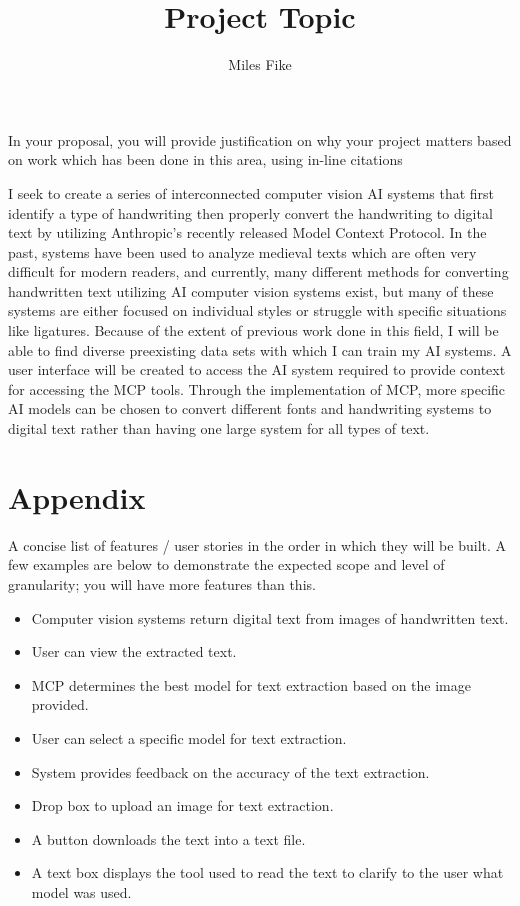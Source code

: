 \documentclass[12pt]{article}
\title{\textbf{Project Topic}}
\author{Miles Fike}
\begin{document}
\maketitle

In your proposal, you will provide justification on why your project matters based on work which has been done in this area, using in-line citations

I seek to create a series of interconnected computer vision AI systems that first identify a type of handwriting then properly convert the handwriting to digital text by utilizing Anthropic’s recently released Model Context Protocol. In the past, systems have been used to analyze medieval texts which are often very difficult for modern readers, and currently, many different methods for converting handwritten text utilizing AI computer vision systems exist, but many of these systems are either focused on individual styles or struggle with specific situations like ligatures. Because of the extent of previous work done in this field, I will be able to find diverse preexisting data sets with which I can train my AI systems. A user interface will be created to access the AI system required to provide context for accessing the MCP tools. Through the implementation of MCP, more specific AI models can be chosen to convert different fonts and handwriting systems to digital text rather than having one large system for all types of text.
\newpage
\section*{Appendix}
A concise list of features / user stories in the order in which they will be built. A few examples are below to demonstrate the expected scope and level of granularity; you will have more features than this.
\begin{itemize}
	\item Computer vision systems return digital text from images of handwritten text.
	\item User can view the extracted text.
	\item MCP determines the best model for text extraction based on the image provided.
	\item User can select a specific model for text extraction.
	\item System provides feedback on the accuracy of the text extraction.
	\item Drop box to upload an image for text extraction.
	\item A button downloads the text into a text file.
	\item A text box displays the tool used to read the text to clarify to the user what model was used.

\end{itemize}




\end{document}
